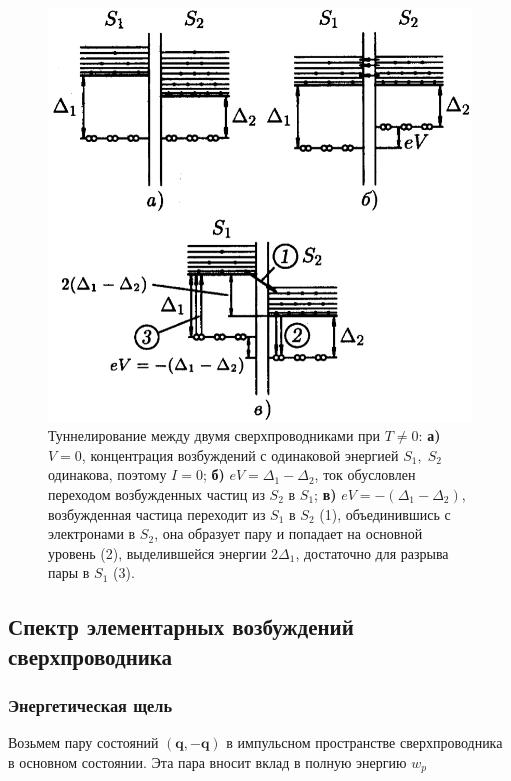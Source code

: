 \documentclass[a4paper]{article}
\begin{document}
\begin{figure}[H]
    \begin{center}
        \includegraphics[scale = 0.5]{p2.png}
        \caption{Туннелирование между двумя сверхпроводниками при $T \neq 0$: \textbf{а)} $V=0$, концентрация возбуждений с одинаковой энергией $S_1, \; S_2$ одинакова, поэтому $I = 0$; \textbf{б)} $eV = \Delta_1-\Delta_2$, ток обусловлен переходом возбужденных частиц из $S_2$ в $S_1$; \textbf{в)} $eV = -(\Delta_1-\Delta_2)$, возбужденная частица переходит из $S_1$ в $S_2$ (1), объединившись с электронами в $S_2$, она образует пару и попадает на основной уровень (2), выделившейся энергии $2 \Delta_1$, достаточно для разрыва пары в $S_1$ (3). }
        \label{p2}
    \end{center}
\end{figure}




\subsection{Спектр элементарных возбуждений сверхпроводника}

\subsubsection{Энергетическая щель}

Возьмем пару состояний $(\mathbf{q}, -\mathbf{q})$ в импульсном пространстве сверхпроводника в основном состоянии. Эта пара вносит вклад в полную энергию $w_p$
\end{document}
